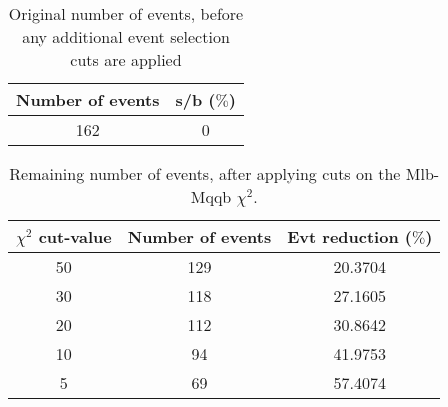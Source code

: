 \documentclass{article}
\begin{document}
 

 \begin{abstract} 
 
   The tables in this document represent the influence of the additional event selection cuts that were applied in order to reduce the number of selected events for CPU reasons. \\ 
   The considered cuts are rather basic and are merely developed to reduce the number of so-called wrong events \\ 
   \begin{itemize} 
     \item Cut on Mlb-Mqqb $\chi^{2}$ distribution 
     \item Cut on top and W-mass window 
   \end{itemize} 
 
   \textbf{Created on :} \today 
 \end{abstract} 
 
 \begin{table}[h!t] 
  \caption{Original number of events, before any additional event selection cuts are applied} 
  \centering 
   \begin{tabular}{c|c} 
     Number of events    & s/b ($\%$)     \\ 
     \hline
     162  & 0 
 
   \end{tabular} 
 \end{table} 
 
 \begin{table}[h!t] 
  \caption{Remaining number of events, after applying cuts on the Mlb-Mqqb $\chi^{2}$.} 
  \centering 
   \begin{tabular}{c|c|c|} 
     $\chi^{2}$ cut-value    & Number of events  & Evt reduction ($\%$)    \\ 
     \hline
     50  &   129  &  20.3704 \\ 
     30  &   118  &  27.1605 \\ 
     20  &   112  &  30.8642 \\ 
     10  &   94  &  41.9753 \\ 
     5  &   69  &  57.4074 \\ 
   \end{tabular} 
 \end{table} 
 
\end{document}
